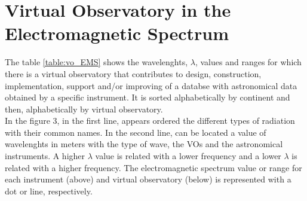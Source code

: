 \section{Virtual Observatory in the Electromagnetic Spectrum}
The table \ref{table:vo_EMS} shows the wavelenghts, $ \lambda $, values and
ranges for which there is a virtual observatory that contributes to design,
construction, implementation, support and/or improving of a databse with
astronomical data obtained by a specific instrument. It is sorted alphabetically
by continent and then, alphabetically by virtual observatory.\\

In the figure 3, in the first line, appears ordered the different types of
radiation with their common names. In the second line, can be located a value of
wavelenghts in meters with the type of wave, the VOs and the astronomical
instruments. A higher $ \lambda $ value is related with a lower frequency and a
lower $ \lambda $ is related with a higher frequency. The electromagnetic
spectrum value or range for each instrument (above) and virtual observatory
(below) is represented with a dot or line, respectively.\\

